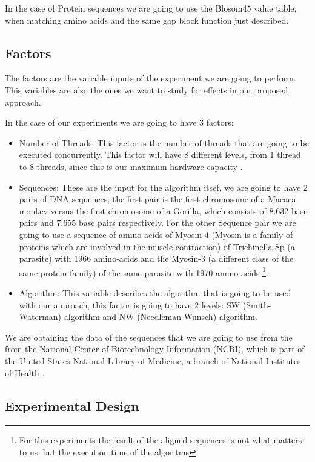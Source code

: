 \documentclass[journal]{IEEEtran}
\begin{document}
In the case of Protein sequences we are going to use the Blosom45 value table, when matching amino acids and the same gap block function just described.


\subsection{Factors}

The factors are the variable inputs of the experiment we are going to perform. This variables are also the ones we want to study for effects in our proposed approach. 

In the case of our experiments we are going to have 3 factors:

\begin{itemize}
    \item Number of Threads: This factor is the number of threads that are going to be executed concurrently. This factor will have 8 different levels, from 1 thread to 8 threads, since this is our maximum hardware capacity .
    \item Sequences: These are the input for the algorithm itsef, we are going to have 2 pairs of DNA sequences, the first pair is the first chromosome of a Macaca monkey versus the first chromosome of a Gorilla, which consists of 8.632 base pairs and 7.655 base pairs respectively. For the other Sequence pair we are going to use a sequence of amino-acids of Myosin-4 (Myosin is a family of proteins which are involved in the muscle contraction) of Trichinella Sp (a parasite)  with 1966 amino-acids and the Myosin-3 (a different class of the same protein family) of the same parasite with 1970 amino-acids \footnote{For this experiments the result of the aligned sequences is not what matters to us, but the execution time of the algoritms}.
    \item Algorithm: This variable describes the algorithm that is going to be used with our approach, this factor is going to have 2 levels: SW (Smith-Waterman) algorithm and NW (Needleman-Wunsch) algorithm. 
\end{itemize}

We are obtaining the data of the sequences that we are going to use from the from the National Center of Biotechnology Information (NCBI), which is part of the United States National Library of Medicine, a branch of National Institutes of Health \cite{NCBI}. 

\subsection{Experimental Design}
\end{document}
